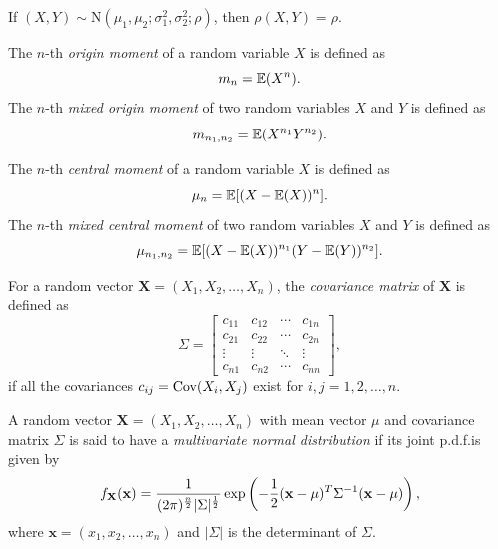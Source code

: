 \begin{proposition}
  If \((X, Y) \sim \mathrm{N}(\mu_1, \mu_2; \sigma_1^2, \sigma_2^2; \rho)\), then \(\rho(X, Y) = \rho\).
\end{proposition}

\begin{definition}
  The \(n\)-th \emph{origin moment} of a random variable \(X\) is defined as
  \[
    m_n = \mathbb{E}(X^n).
  \]
  The \(n\)-th \emph{mixed origin moment} of two random variables \(X\) and \(Y\) is defined as
  \[
    m_{n_1, n_2} = \mathbb{E}(X^{n_1} Y^{n_2}).
  \]
\end{definition}

\begin{definition}
  The \(n\)-th \emph{central moment} of a random variable \(X\) is defined as
  \[
    \mu_n = \mathbb{E}[(X - \mathbb{E}(X))^n].
  \]
  The \(n\)-th \emph{mixed central moment} of two random variables \(X\) and \(Y\) is defined as
  \[
    \mu_{n_1, n_2} = \mathbb{E}[(X - \mathbb{E}(X))^{n_1} (Y - \mathbb{E}(Y))^{n_2}].
  \]
\end{definition}

\begin{definition}
  For a random vector \(\mathbf{X} = (X_1, X_2, \dots, X_n)\), the \emph{covariance matrix} of \(\mathbf{X}\) is defined as
  \[
    \Sigma = \begin{bmatrix}
      c_{11} & c_{12} & \cdots & c_{1n} \\
      c_{21} & c_{22} & \cdots & c_{2n} \\
      \vdots & \vdots & \ddots & \vdots \\
      c_{n1} & c_{n2} & \cdots & c_{nn}
    \end{bmatrix},
  \]
  if all the covariances \(c_{ij} = \mathrm{Cov}(X_i, X_j)\) exist for \(i, j = 1, 2, \dots, n\).
\end{definition}

\begin{definition}
  A random vector \(\mathbf{X} = (X_1, X_2, \dots, X_n)\) with mean vector \(\mu\) and covariance matrix \(\Sigma\) is said to have a \emph{multivariate normal distribution} if its joint p.d.f.\@ is given by
  \[
    f_{\mathbf{X}}(\mathbf{x}) = \frac{1}{(2\mathrm{\pi})^{\frac{n}{2}} |\Sigma|^{\frac{1}{2}}} \exp\left(-\frac{1}{2} (\mathbf{x} - \mu)^T \Sigma^{-1} (\mathbf{x} - \mu)\right),
  \]
  where \(\mathbf{x} = (x_1, x_2, \dots, x_n)\) and \(|\Sigma|\) is the determinant of \(\Sigma\).  
\end{definition}

